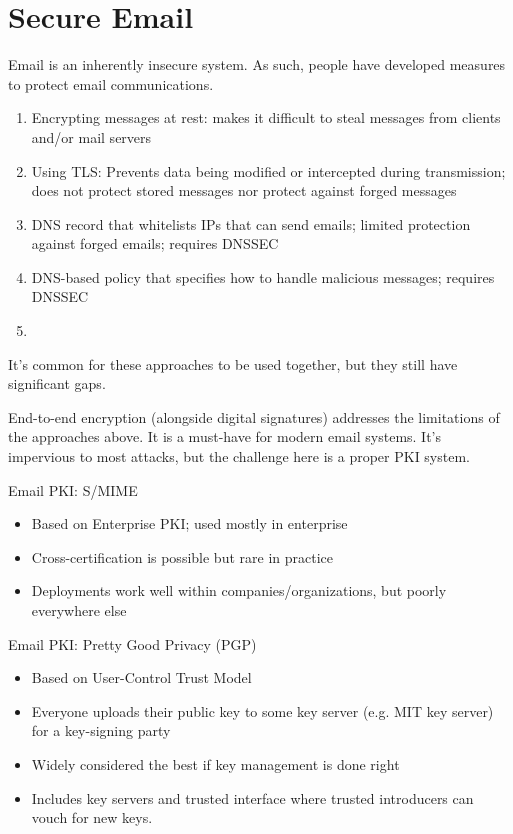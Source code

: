 \section{Secure Email}
Email is an inherently insecure system. As such, people have developed measures to protect email communications.
\begin{enumerate}
    \item Encrypting messages at rest: makes it difficult to steal messages from clients and/or mail servers
    \item Using TLS: Prevents data being modified or intercepted during transmission; does not protect stored messages nor protect against forged messages
    \item {} DNS record that whitelists IPs that can send emails; limited protection against forged emails; requires DNSSEC
    \item {} DNS-based policy that specifies how to handle malicious messages; requires DNSSEC
    \item
\end{enumerate}

It's common for these approaches to be used together, but they still have significant gaps.

End-to-end encryption (alongside digital signatures) addresses the limitations of the approaches above. It is a must-have for modern email systems. It's impervious to most attacks, but the challenge here is a proper PKI system.

\begin{exbox}{Email PKI: S/MIME}{}
    \begin{itemize}[noitemsep]
        \item Based on Enterprise PKI; used mostly in enterprise
        \item Cross-certification is possible but rare in practice
        \item Deployments work well within companies/organizations, but poorly everywhere else
    \end{itemize}
\end{exbox}

\begin{exbox}{Email PKI: Pretty Good Privacy (PGP)}{}
    \begin{itemize}[noitemsep]
        \item Based on User-Control Trust Model
        \item Everyone uploads their public key to some key server (e.g. MIT key server) for a key-signing party
        \item Widely considered the best if key management is done right
        \item Includes key servers and trusted interface where trusted introducers can vouch for new keys.
    \end{itemize}
\end{exbox}

